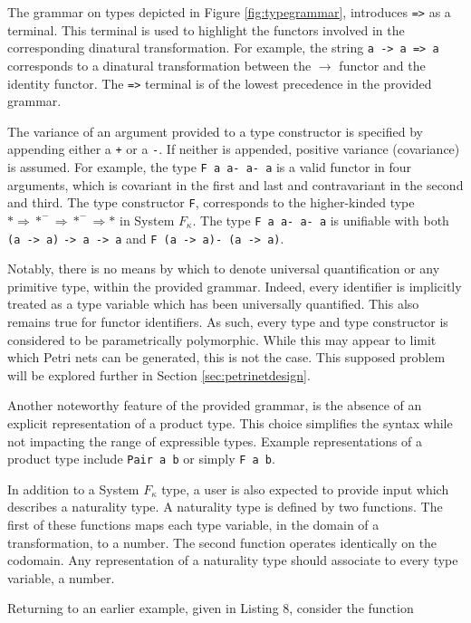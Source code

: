 \documentclass[../Dissertation.tex]{subfiles}
\begin{document}
The grammar on types depicted in Figure \ref{fig:typegrammar}, introduces \lstinline{=>} as a terminal. This terminal is used to highlight the functors involved in the corresponding dinatural transformation. For example, the string \lstinline{a -> a => a} corresponds to a dinatural transformation between the $\rightarrow$ functor and the identity functor. The \lstinline{=>} terminal is of the lowest precedence in the provided grammar.
\par
The variance of an argument provided to a type constructor is specified by appending either a \lstinline{+} or a \lstinline{-}. If neither is appended, positive variance (covariance) is assumed. For example, the type \lstinline{F a a- a- a} is a valid functor in four arguments, which is covariant in the first and last and contravariant in the second and third. The type constructor \lstinline{F}, corresponds to the higher-kinded type $* \Rightarrow *^- \Rightarrow *^- \Rightarrow *$ in System $F_\kappa$. The type \lstinline{F a a- a- a} is unifiable with both \lstinline{(a -> a)} \lstinline{-> a -> a} and \lstinline{F (a -> a)- (a -> a)}.
\par
Notably, there is no means by which to denote universal quantification or any primitive type, within the provided grammar. Indeed, every identifier is implicitly treated as a type variable which has been universally quantified. This also remains true for functor identifiers. As such, every type and type constructor is considered to be parametrically polymorphic. While this may appear to limit which Petri nets can be generated, this is not the case. This supposed problem will be explored further in Section \ref{sec:petrinetdesign}.
\par
Another noteworthy feature of the provided grammar, is the absence of an explicit representation of a product type. This choice simplifies the syntax while not impacting the range of expressible types. Example representations of a product type include \lstinline{Pair a b} or simply \lstinline{F a b}. 
\par
In addition to a System $F_\kappa$ type, a user is also expected to provide input which describes a naturality type. A naturality type is defined by two  functions. The first of these functions maps each type variable, in the domain of a transformation, to a number. The second function operates identically on the codomain. Any representation of a naturality type should associate to every type variable, a number.
\par
Returning to an earlier example, given in Listing 8, consider the function
\end{document}
